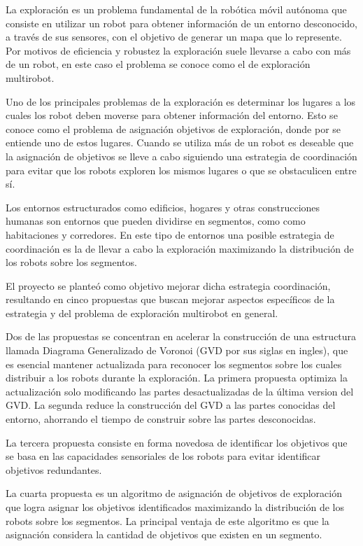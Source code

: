 La exploración es un problema fundamental de la robótica móvil autónoma que
consiste en utilizar un robot para obtener información de un entorno
desconocido, a través de sus sensores, con el objetivo de generar un mapa que lo
represente. Por motivos de eficiencia y robustez la exploración suele llevarse
a cabo con más de un robot, en este caso el problema se conoce como el de
exploración multirobot.

Uno de los principales problemas de la exploración es determinar los lugares a
los cuales los robot deben moverse para obtener información del entorno. Esto
se conoce como el problema de asignación objetivos de exploración, donde por
 se entiende uno de estos lugares. Cuando se
utiliza más de un robot es deseable que la asignación de objetivos se lleve
a cabo siguiendo una estrategia de coordinación para evitar que los robots
exploren los mismos lugares o que se obstaculicen entre sí.

Los entornos estructurados como edificios, hogares y otras construcciones
humanas son entornos que pueden dividirse en segmentos, como como habitaciones
y corredores. En este tipo de entornos una posible estrategia de coordinación
es la de llevar a cabo la exploración maximizando la distribución de los
robots sobre los segmentos. 

El proyecto se planteó como objetivo mejorar dicha estrategia coordinación,
resultando en cinco propuestas que buscan mejorar aspectos específicos de la
estrategia y del problema de exploración multirobot en general.

Dos de las propuestas se concentran en acelerar la construcción de una
estructura llamada Diagrama Generalizado de Voronoi (GVD por sus siglas en
ingles), que es esencial mantener actualizada para reconocer los segmentos
sobre los cuales distribuir a los robots durante la exploración. La primera
propuesta optimiza la actualización solo modificando las partes desactualizadas 
de la última version del GVD. La segunda reduce la construcción del GVD a las
partes conocidas del entorno, ahorrando el tiempo de construir sobre las
partes desconocidas.

La tercera propuesta consiste en forma novedosa de identificar los objetivos
que se basa en las capacidades sensoriales de los robots para evitar
identificar objetivos redundantes.

La cuarta propuesta es un algoritmo de asignación de objetivos de exploración que
logra asignar los objetivos identificados maximizando la distribución de los
robots sobre los segmentos. La principal ventaja de este algoritmo es que la
asignación considera la cantidad de objetivos que existen en un segmento.

